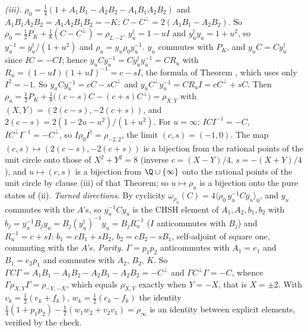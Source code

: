 \emph{(iii).} $\rho_{0} = \tfrac14(1 + A_{1}B_{1} - A_{2}B_{2} - A_{1}B_{1}A_{2}B_{2})$ and $A_{1}B_{1}A_{2}B_{2} = A_{1}A_{2}B_{1}B_{2} = -K$; $C - C^{\perp} = 2(A_{1}B_{1} - A_{2}B_{2})$. So $\rho_{0} = \tfrac12P_{K} + \tfrac18(C - C^{\perp}) = \rho_{2,-2}$. $y_{u}^{\dagger} = 1 - uI$ and $y_{u}^{\dagger}y_{u} = 1 + u^{2}$, so $y_{u}^{-1} = y_{u}^{\dagger}/(1 + u^{2})$ and $\rho_{u} = y_{u}\rho_{0}y_{u}^{-1}$. $y_{u}$ commutes with $P_{K}$, and $y_{u}C = Cy_{u}^{\dagger}$ since $IC = -CI$; hence $y_{u}Cy_{u}^{-1} = Cy_{u}^{\dagger}y_{u}^{-1} = CR_{u}$ with $R_{u} = (1 - uI)(1 + uI)^{-1} = c - sI$, the formula of Theorem , which uses only $I^{2} = -1$. So $y_{u}Cy_{u}^{-1} = cC - sC^{\perp}$ and $y_{u}C^{\perp}y_{u}^{-1} = CR_{u}I = cC^{\perp} + sC$. Then $\rho_{u} = \tfrac12P_{K} + \tfrac18\bigl((c - s)C - (c + s)C^{\perp}\bigr) = \rho_{X,Y}$ with $(X, Y) = (2(c - s), -2(c + s))$, and $2(c - s) = 2(1 - 2u - u^{2})/(1 + u^{2})$. For $u = \infty$: $ICI^{-1} = -C$, $IC^{\perp}I^{-1} = -C^{\perp}$, so $I\rho_{0}I^{\dagger} = \rho_{-2,2}$, the limit $(c, s) = (-1, 0)$. The map $(c, s) \mapsto (2(c - s), -2(c + s))$ is a bijection from the rational points of the unit circle onto those of $X^{2} + Y^{2} = 8$ (inverse $c = (X - Y)/4$, $s = -(X + Y)/4$), and $u \mapsto (c, s)$ is a bijection from $\Q \cup \{\infty\}$ onto the rational points of the unit circle by clause (iii) of that Theorem; so $u \mapsto \rho_{u}$ is a bijection onto the pure states of (ii). \emph{Turned directions.} By cyclicity $\omega_{\rho_{u}}(C) = 4\langle\rho_{0}\,y_{u}^{-1}Cy_{u}\rangle_{0}$, and $y_{u}$ commutes with the $A$'s, so $y_{u}^{-1}Cy_{u}$ is the CHSH element of $A_{1}, A_{2}, b_{1}, b_{2}$ with $b_{j} = y_{u}^{-1}B_{j}y_{u} = B_{j}(y_{u}^{\dagger})^{-1}y_{u} = B_{j}R_{u}^{-1}$ ($I$ anticommutes with $B_{j}$) and $R_{u}^{-1} = c + sI$: $b_{1} = cB_{1} + sB_{2}$, $b_{2} = cB_{2} - sB_{1}$, self-adjoint of square one, commuting with the $A$'s. \emph{Parity.} $\Gamma = p_{1}p_{2}$ anticommutes with $A_{1} = e_{1}$ and $B_{1} = e_{2}p_{1}$ and commutes with $A_{2}$, $B_{2}$, $K$. So $\Gamma C\Gamma = A_{1}B_{1} - A_{1}B_{2} - A_{2}B_{1} - A_{2}B_{2} = -C^{\perp}$ and $\Gamma C^{\perp}\Gamma = -C$, whence $\Gamma\rho_{X,Y}\Gamma = \rho_{-Y,-X}$, which equals $\rho_{X,Y}$ exactly when $Y = -X$, that is $X = \pm 2$. With $v_{k} = \tfrac12(e_{k} + f_{k})$, $w_{k} = \tfrac12(e_{k} - f_{k})$ the identity $\tfrac14(1 + p_{1}p_{2}) - \tfrac12(w_{1}w_{2} + v_{2}v_{1}) = \rho_{\infty}$ is an identity between explicit elements, verified by the check.


